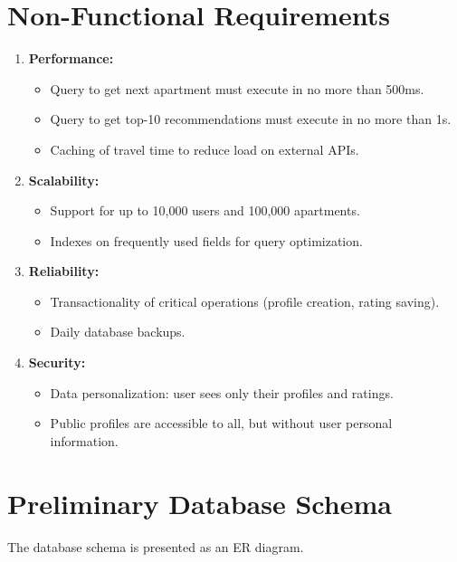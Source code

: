 \documentclass[12pt,a4paper]{article}
\begin{document}
\section{Non-Functional Requirements}

\begin{enumerate}
    \item \textbf{Performance:}
    \begin{itemize}
        \item Query to get next apartment must execute in no more than 500ms.
        \item Query to get top-10 recommendations must execute in no more than 1s.
        \item Caching of travel time to reduce load on external APIs.
    \end{itemize}
    
    \item \textbf{Scalability:}
    \begin{itemize}
        \item Support for up to 10,000 users and 100,000 apartments.
        \item Indexes on frequently used fields for query optimization.
    \end{itemize}
    
    \item \textbf{Reliability:}
    \begin{itemize}
        \item Transactionality of critical operations (profile creation, rating saving).
        \item Daily database backups.
    \end{itemize}
    
    \item \textbf{Security:}
    \begin{itemize}
        \item Data personalization: user sees only their profiles and ratings.
        \item Public profiles are accessible to all, but without user personal information.
    \end{itemize}
\end{enumerate}

\section{Preliminary Database Schema}

The database schema is presented as an ER diagram.
\end{document}
